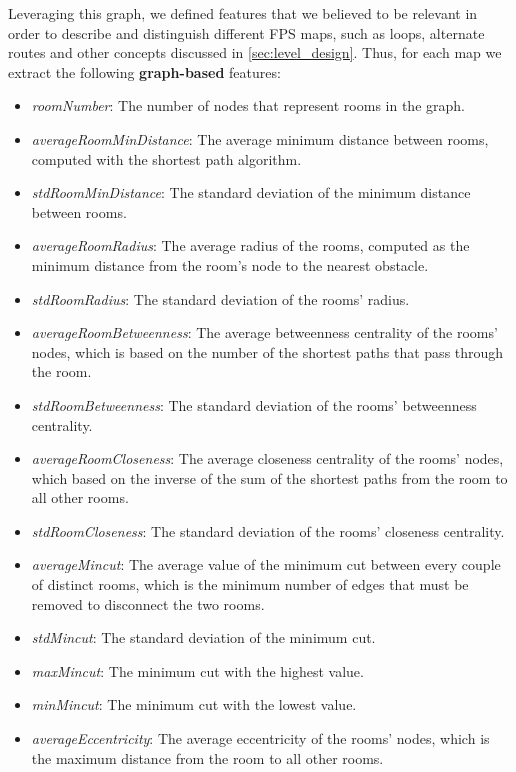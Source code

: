 Leveraging this graph, we defined features that we believed to be relevant in order to describe and distinguish different FPS maps, such as loops, alternate routes and other concepts discussed in \cref{sec:level_design}.
Thus, for each map we extract the following \textbf{graph-based} features:

\begin{itemize}
    \item \textit{roomNumber}: The number of nodes that represent rooms in the graph.
    \item \textit{averageRoomMinDistance}: The average minimum distance between rooms, computed with the shortest path algorithm.
    \item \textit{stdRoomMinDistance}: The standard deviation of the minimum distance between rooms.
    \item \textit{averageRoomRadius}: The average radius of the rooms, computed as the minimum distance from the room's node to the nearest obstacle.
    \item \textit{stdRoomRadius}: The standard deviation of the rooms' radius.
    \item \textit{averageRoomBetweenness}: The average betweenness centrality of the rooms' nodes, which is based on the number of the shortest paths that pass through the room.
    \item \textit{stdRoomBetweenness}: The standard deviation of the rooms' betweenness centrality.
    \item \textit{averageRoomCloseness}: The average closeness centrality of the rooms' nodes, which based on the inverse of the sum of the shortest paths from the room to all other rooms.
    \item \textit{stdRoomCloseness}: The standard deviation of the rooms' closeness centrality.
    \item \textit{averageMincut}: The average value of the minimum cut between every couple of distinct rooms, which is the minimum number of edges that must be removed to disconnect the two rooms. 
    \item \textit{stdMincut}: The standard deviation of the minimum cut.
    \item \textit{maxMincut}: The minimum cut with the highest value.
    \item \textit{minMincut}: The minimum cut with the lowest value.
    \item \textit{averageEccentricity}: The average eccentricity of the rooms' nodes, which is the maximum distance from the room to all other rooms.

\end{itemize}
